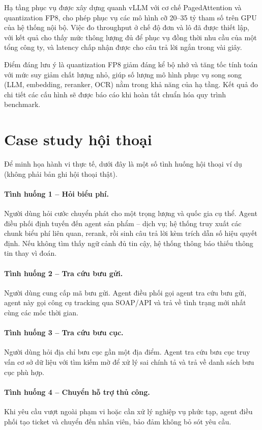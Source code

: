 Hạ tầng phục vụ được xây dựng quanh vLLM với cơ chế PagedAttention và quantization FP8,
cho phép phục vụ các mô hình cỡ 20--35 tỷ tham số trên GPU của hệ thống nội bộ. Việc đo
throughput ở chế độ đơn và lô đã được thiết lập, với kết quả cho thấy mức thông lượng đủ
để phục vụ đồng thời nhu cầu của một tổng công ty, và latency chấp nhận được cho câu trả
lời ngắn trong vài giây.

Điểm đáng lưu ý là quantization FP8 giảm đáng kể bộ nhớ và tăng tốc tính toán với mức suy
giảm chất lượng nhỏ, giúp số lượng mô hình phục vụ song song (LLM, embedding, reranker,
OCR) nằm trong khả năng của hạ tầng. Kết quả đo chi tiết các cấu hình sẽ được báo cáo khi
hoàn tất chuẩn hóa quy trình benchmark.

\section{Case study hội thoại}
\label{sec:casestudy}

Để minh họa hành vi thực tế, dưới đây là một số tình huống hội thoại ví dụ (không phải bản
ghi hội thoại thật).

\paragraph{Tình huống 1 -- Hỏi biểu phí.} Người dùng hỏi cước chuyển phát cho một trọng
lượng và quốc gia cụ thể. Agent điều phối định tuyến đến agent \rag{} sản phẩm -- dịch vụ;
hệ thống truy xuất các chunk biểu phí liên quan, rerank, rồi sinh câu trả lời kèm trích
dẫn số hiệu quyết định. Nếu không tìm thấy ngữ cảnh đủ tin cậy, hệ thống thông báo thiếu
thông tin thay vì đoán.

\paragraph{Tình huống 2 -- Tra cứu bưu gửi.} Người dùng cung cấp mã bưu gửi. Agent điều
phối gọi agent tra cứu bưu gửi, agent này gọi công cụ tracking qua SOAP/API và trả về tình
trạng mới nhất cùng các mốc thời gian.

\paragraph{Tình huống 3 -- Tra cứu bưu cục.} Người dùng hỏi địa chỉ bưu cục gần một địa
điểm. Agent tra cứu bưu cục truy vấn cơ sở dữ liệu với tìm kiếm mờ để xử lý sai chính tả
và trả về danh sách bưu cục phù hợp.

\paragraph{Tình huống 4 -- Chuyển hỗ trợ thủ công.} Khi yêu cầu vượt ngoài phạm vi hoặc
cần xử lý nghiệp vụ phức tạp, agent điều phối tạo ticket và chuyển đến nhân viên, bảo đảm
không bỏ sót yêu cầu.

